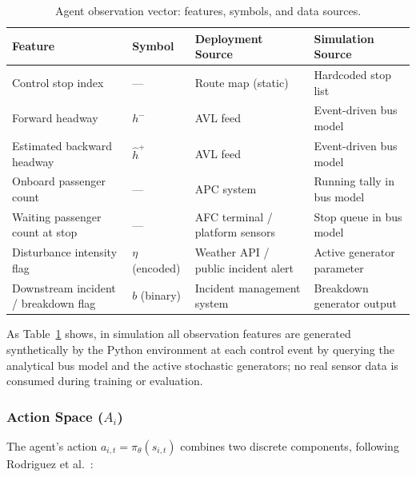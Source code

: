 \begin{table}[htbp]
\centering
\caption{Agent observation vector: features, symbols, and data sources.}
\label{tab:observation-features}
\small
\renewcommand{\arraystretch}{1.25}

\begin{tabularx}{\textwidth}{
>{\RaggedRight\arraybackslash}p{}
>{\RaggedRight\arraybackslash}p{}
>{\RaggedRight\arraybackslash}X
>{\RaggedRight\arraybackslash}X
}

\toprule
\textbf{Feature} & \textbf{Symbol} & \textbf{Deployment Source} & \textbf{Simulation Source} \\
\midrule

Control stop index & --- & Route map (static) & Hardcoded stop list \\
Forward headway & $h^-$ & AVL feed & Event-driven bus model \\
Estimated backward headway & $\hat{h}^+$ & AVL feed & Event-driven bus model \\
Onboard passenger count & --- & APC system & Running tally in bus model \\
Waiting passenger count at stop & --- & AFC terminal / platform sensors & Stop queue in bus model \\
Disturbance intensity flag & $\eta$ (encoded) & Weather API / public incident alert & Active generator parameter \\
Downstream incident / breakdown flag & $b$ (binary) & Incident management system & Breakdown generator output \\

\bottomrule
\end{tabularx}
\end{table}

As Table~\ref{tab:observation-features} shows, in simulation all observation features are generated synthetically by the Python environment at each control event by querying the analytical bus model and the active stochastic generators; no real sensor data is consumed during training or evaluation.

\subsubsection{Action Space ($A_i$)}
\label{subsec:action-space}

The agent's action $a_{i,t} = \pi_\theta(s_{i,t})$ combines two discrete components, following Rodriguez et al.~\cite{Rodriguez2023Cooperative}:

